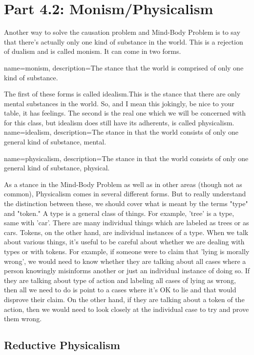 \section{Part 4.2: Monism/Physicalism}

Another way to solve the causation problem and Mind-Body Problem is to say that there’s actually only one kind of substance in the world. This is a rejection of dualism and is called \gls{monism}. It can come in two forms.

{
name=monism,
description={The stance that the world is comprised of only one kind of substance.}
}


The first of these forms is called \Gls{idealism}.This is the stance that there are only mental substances in the world. So, and I mean this jokingly, be nice to your table, it has feelings. The second is the real one which we will be concerned with for this class, but idealism does still have its adherents, is called \Gls{physicalism}. 
{
name=idealism,
description={The stance in that the world consists of only one general kind of substance, mental.}
}

{
name=physicalism,
description={The stance in that the world consists of only one general kind of substance, physical.}
}


As a stance in the Mind-Body Problem as well as in other areas (though not as common), Physicalism comes in several different forms. But to really understand the distinction between these, we should cover what is meant by the terms "type" and "token." A type is a general class of things. For example, 'tree' is a type, same with 'car'. There are many individual things which are labeled as trees or as cars. Tokens, on the other hand, are individual instances of a type. When we talk about various things, it's useful to be careful about whether we are dealing with types or with tokens. For example, if someone were to claim that 'lying is morally wrong', we would need to know whether they are talking about all cases where a person knowingly misinforms another or just an individual instance of doing so. If they are talking about type of action and labeling all cases of lying as wrong, then all we need to do is point to a cases where it's OK to lie and that would disprove their claim. On the other hand, if they are talking about a token of the action, then we would need to look closely at the individual case to try and prove them wrong.

\subsection{Reductive Physicalism}

